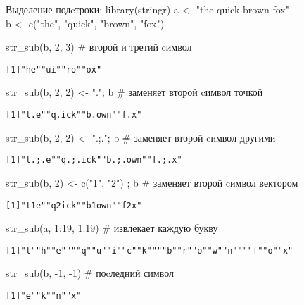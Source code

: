 \begin{frame}{Выделение подcтроки: library(stringr)}
a <- "the quick brown fox"\\
b <- c("the"{}, "quick"{}, "brown"{}, "fox"{})
\begin{itemize}
\mytem str\_sub(b, 2, 3) \hfill \# второй и третий cимвол
\footnotesize
\begin{alltt}
[1] "he"{ }"ui"{ }"ro"{ }"ox"
\end{alltt}
\normalsize
\vfill
\mytem str\_sub(b, 2, 2) <- "."; b \hfill \# заменяет второй cимвол точкой
\footnotesize
\begin{alltt}
[1] "t.e"{ }"q.ick"{ }"b.own"{ }"f.x"
\end{alltt}
\normalsize
\vfill
\mytem str\_sub(b, 2, 2) <- ".;."; b \hfill \# заменяет второй cимвол другими
\footnotesize
\begin{alltt}
[1] "t.;.e"{ }"q.;.ick"{ }"b.;.own"{ }"f.;.x"
\end{alltt}
\normalsize
\vfill
\mytem str\_sub(b, 2) <- c("1"{}, "2") ; b \hfill \# заменяет второй cимвол вектором
\footnotesize
\begin{alltt}
[1] "t1e"{ }"q2ick"{ }"b1own"{ }"f2x"
\end{alltt}
\normalsize
\vfill
\mytem str\_sub(a, 1:19, 1:19) \hfill \# извлекает каждую букву
\scriptsize
\begin{alltt}
[1] "t"{ }"h"{ }"e"{ }"{ }"{ }"q"{ }"u"{ }"i"{ }"c"{ }"k"{ }"{ }"{ }"b"{ }"r"{ }"o"{ }"w"{ }"n"{ }"{ }"{ }"f"{ }"o"{ }"x"
\end{alltt}
\normalsize
\vfill
\mytem str\_sub(b, -1, -1) \hfill \# поcледний символ
\footnotesize
\begin{alltt}
[1] "e"{ }"k"{ }"n"{ }"x"
\end{alltt}
\normalsize
\end{itemize}
\end{frame}
